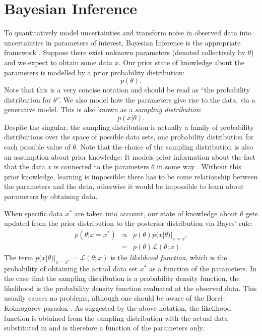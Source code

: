 \documentclass[12pt, preprint]{aastex}
\begin{document}
\section{Bayesian Inference}\label{sec:bayes}
To quantitatively model uncertainties and transform noise in observed data
into uncertainties in parameters of interest, Bayesian Inference is the appropriate
framework \citep{cox, jaynes, caticha, mackay}. Suppose there exist unknown parameters
(denoted
collectively by $\theta$) and we expect to obtain some data $x$. Our prior
state of knowledge about the parameters is modelled by a prior
probability distribution:
\begin{equation}
p(\theta).
\end{equation}
Note that this is a very concise notation \citep{hogg} and should be read
as ``the probability distribution for $\theta$''.
We also model how the parameters give rise to the data, via a generative model.
This is also known as a {\it sampling distribution}:
\begin{equation}
p(x|\theta).
\end{equation}
Despite the singular, the sampling distribution is actually a family of
probability distributions over the space of possible data sets, one probability
distribution for each possible value
of $\theta$. Note that the choice of
the sampling distribution is also an assumption about prior knowledge:
It models prior information about the fact that the data $x$ is connected to
the parameters $\theta$ in some way \citep{caticha}. Without this prior
knowledge, learning is impossible: there has to be some relationship between
the parameters and the data, otherwise it would be impossible to learn about
parameters by obtaining data.

When specific data $x^*$ are taken into account, our state of knowledge about $\theta$
gets updated from the prior distribution to the posterior distribution
via Bayes' rule:
\begin{eqnarray}
p(\theta|x=x^*) &\propto& p(\theta)p(x|\theta)|_{x=x^*} \\
&=& p(\theta)\mathcal{L}(\theta; x)
\end{eqnarray}
The term $p(x|\theta)|_{x=x^*} = \mathcal{L}(\theta; x)$
is the {\it likelihood function}, which is the
probability of obtaining the actual data set $x^*$ as a function of the
parameters. In the case that the sampling distribution is a probability
density function, the likelihood is the probability density function evaluated at the observed
data. This usually causes no problems, although one should be aware of the
Borel-Kolmogorov paradox \citep{jaynes}.
As suggested by the above notation, the likelihood function is obtained from the
sampling distribution with the actual data substituted in and is therefore
a function of the parameters only.
\end{document}
